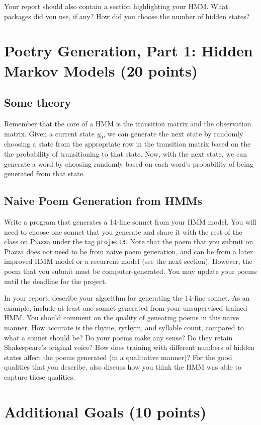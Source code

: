 Your report should also contain a section highlighting your HMM. What packages did you use, if any? How did you choose the number of hidden states? \newline

\section{Poetry Generation, Part 1: Hidden Markov Models (20 points)}
\subsection{Some theory}
Remember that the core of a HMM is the transition matrix and the observation matrix. Given a current state $y_0$, we can generate the next state by randomly choosing a state from the appropriate row in the transition matrix based on the the probability of transitioning to that state. Now, with the next state, we can generate a word by choosing randomly based on each word's probability of being generated from that state.
\subsection{Naive Poem Generation from HMMs}
Write a program that generates a 14-line sonnet from your HMM model. You will need to choose one sonnet that you generate and share it with the rest of the class on Piazza under the tag {\tt project3}. Note that the poem that you submit on Piazza does not need to be from naive poem generation, and can be from a later improved HMM model or a recurrent model (see the next section). However, the poem that you submit must be computer-generated. You may update your poems until the deadline for the project.

In your report, describe your algorithm for generating the 14-line sonnet. As an example, include at least one sonnet generated from your unsupervised trained HMM. You should comment on the quality of geneating poems in this naive manner. How accurate is the rhyme, rythym, and syllable count, compared to what a sonnet should be? Do your poems make any sense? Do they retain Shakespeare's original voice? How does training with different numbers of hidden states affect the poems generated (in a qualitative manner)? For the good qualities that you describe, also discuss how you think the HMM was able to capture these qualities.


\section{Additional Goals (10 points)}

